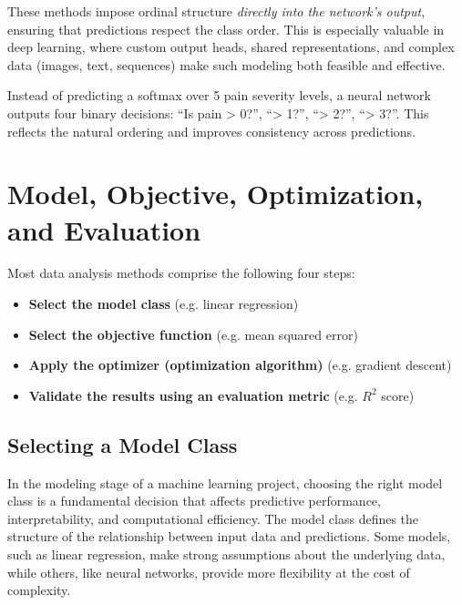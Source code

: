 \documentclass[12pt,openany]{book}
\begin{document}
These methods impose ordinal structure \emph{directly into the network’s output}, ensuring that predictions respect the class order. This is especially valuable in deep learning, where custom output heads, shared representations, and complex data (images, text, sequences) make such modeling both feasible and effective.

\begin{examplebox}
Instead of predicting a softmax over 5 pain severity levels, a neural network outputs four binary decisions: “Is pain \textgreater{} 0?”, “\textgreater{} 1?”, “\textgreater{} 2?”, “\textgreater{} 3?”. This reflects the natural ordering and improves consistency across predictions.
\end{examplebox}


\vspace{10pt}



\chapter{Model, Objective, Optimization, and Evaluation}

Most data analysis methods comprise the following four steps:
\begin{itemize}
    \item \textbf{Select the model class} (e.g. linear regression)
    \item \textbf{Select the objective function} (e.g. mean squared error)
    \item \textbf{Apply the optimizer (optimization algorithm)} (e.g. gradient descent)
    \item \textbf{Validate the results using an evaluation metric} (e.g. $R^2$ score)
\end{itemize}


\section{Selecting a Model Class}

In the modeling stage of a machine learning project, choosing the right model class is a fundamental decision that affects predictive performance, interpretability, and computational efficiency. The model class defines the structure of the relationship between input data and predictions. Some models, such as linear regression, make strong assumptions about the underlying data, while others, like neural networks, provide more flexibility at the cost of complexity.
\newline
\end{document}
